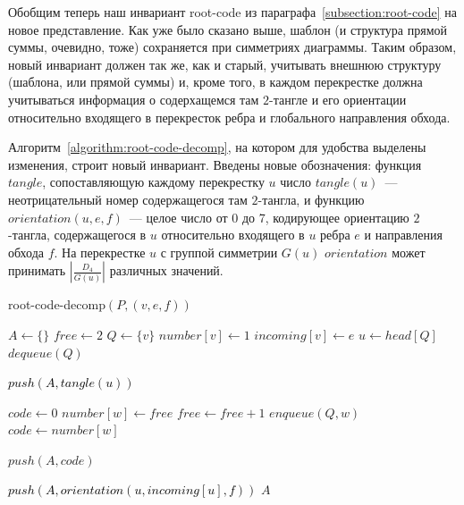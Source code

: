 \documentclass[12pt]{article}
\theoremstyle{plain}
\theoremstyle{definition}
\def\RC{\hbox{root-code}}
\begin{document}
		Обобщим теперь наш инвариант \RC{} из параграфа~\ref{subsection:root-code} на новое представление. Как уже было сказано выше,
		шаблон (и структура прямой суммы, очевидно, тоже) сохраняется при симметриях диаграммы. Таким образом, новый инвариант должен
		так же, как и старый, учитывать внешнюю структуру (шаблона, или прямой суммы) и, кроме того, в каждом перекрестке должна учитываться
		информация о содерхащемся там $2$-тангле и его ориентации относительно входящего в перекресток ребра и глобального направления обхода.

		Алгоритм~\ref{algorithm:root-code-decomp}, на котором для удобства выделены изменения, строит новый инвариант. Введены новые
		обозначения: функция $tangle$, сопоставляющую каждому перекрестку $u$ число $tangle(u)$~--- неотрицательный номер содержащегося там
		$2$-тангла, и функцию $orientation(u,e,f)$~--- целое число от 0 до 7, кодирующее ориентацию $2$-тангла, содержащегося в $u$ относительно
		входящего в $u$ ребра $e$ и направления обхода $f$. На перекрестке $u$ с группой симметрии $G(u)$ $orientation$ может принимать
		$|\frac{D_4}{G(u)}|$ различных значений.
		
		\begin{algorithm}[ht]
			\footnotesize
			\caption{\small root-code-decomp$(P, (v, e, f))$\label{algorithm:root-code-decomp}}

			{\color{Gray}
			\begin{algorithmic}[1]
\STATE $A \leftarrow \{\}$
\STATE $free \leftarrow 2$
\STATE $Q \leftarrow \{v\}$
\STATE $number[v] \leftarrow 1$
\STATE $incoming[v] \leftarrow e$
    \STATE $u \leftarrow head[Q]$
    \STATE $dequeue(Q)$

    \STATE \textcolor{Black}{$push(A, tangle(u))$}

            \STATE $code \leftarrow 0$
        \ELSE
                \STATE $number[w] \leftarrow free$
                \STATE $free \leftarrow free + 1$
                \STATE $enqueue(Q, w)$
            \ENDIF
            \STATE $code \leftarrow number[w]$
        \ENDIF

        \STATE $push(A, code)$
    \ENDFOR

    \STATE \textcolor{Black}{$push(A, orientation(u, incoming[u], f))$}
\ENDWHILE
\RETURN $A$
			\end{algorithmic}
			}
		\end{algorithm}
\end{document}
